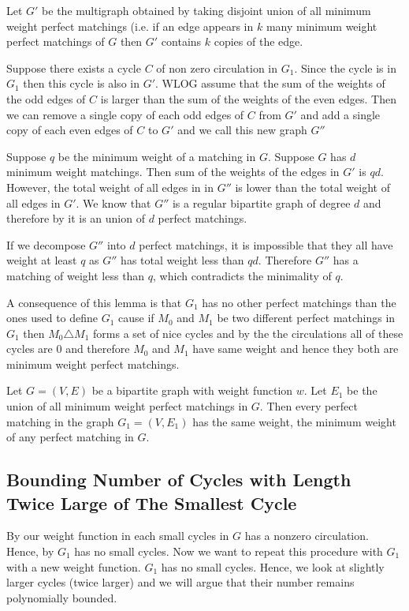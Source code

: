\begin{alternate-proof}
		Let $G'$ be the multigraph obtained by taking disjoint union of all minimum weight perfect matchings (i.e. if an edge appears in $k$ many minimum weight perfect matchings of $G$ then $G'$ contains  $k$ copies of the edge.
		
		
		Suppose there exists a cycle $C$ of non zero circulation in $G_1$. Since the cycle is in $G_1$ then this cycle is also in $G'$. WLOG  assume that the sum of the weights of the odd edges of $C$ is larger than the sum of the weights of the even edges. Then we can remove a single copy of each odd edges of $C$ from $G'$ and add a single copy of each even edges of $C$ to $G'$ and we call this new graph $G''$
		
		Suppose $q$ be the minimum weight of a matching in $G$. Suppose $G$ has $d$ minimum weight matchings. Then sum of the weights of the edges in $G'$ is $qd$.	However, the total weight of all edges in in $G''$ is lower than the total weight of all edges in $G'$. We know  that $G''$ is a regular bipartite graph of degree $d$ and therefore by  it is an union of $d$ perfect matchings.
		
		If we decompose $G''$ into $d$ perfect matchings, it is impossible that they all have weight at least $q$ as $G''$ has total weight less than $qd$. Therefore $G''$ has a matching of weight less than $q$, which contradicts the minimality of $q$. 
\end{alternate-proof}
A consequence of this lemma is that $G_1$ has no other perfect matchings than the ones used to define $G_1$ cause if $M_0$ and $M_1$ be two different perfect matchings in $G_1$ then $M_0\triangle M_1$ forms a set of nice cycles and by the  the circulations all of these cycles are 0 and therefore $M_0$ and $M_1$ have same weight and hence they both are minimum weight perfect matchings.
\begin{corolary}{}{}
	Let $G=(V,E)$ be a bipartite graph with weight function $w$. Let $E_1$ be the union of all minimum weight perfect matchings in $G$. Then every perfect matching in the graph $G_1=(V,E_1)$ has the same weight, the minimum weight of any perfect matching in $G$.
\end{corolary}
\subsection{Bounding Number of Cycles with Length Twice Large of The Smallest Cycle}
By our weight function in  each small cycles in $G$ has a nonzero circulation. Hence, by  $G_1$ has no small cycles. Now we want to repeat this procedure with $G_1$ with a new weight function. $G_1$ has no small cycles. Hence, we look at slightly larger cycles (twice larger) and we will argue that their number remains polynomially bounded.

